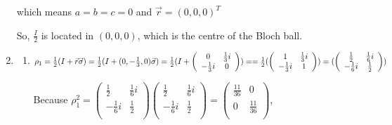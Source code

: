 \documentclass{article}
\begin{document}
\begin{enumerate}
          which means $a=b=c=0$ and $\vec{r}=(0,0,0)^T$

          So, $\frac{I}{2}$ is located in $(0,0,0)$, which is the centre of the Bloch ball.
    \item \begin{enumerate}
              \item $\rho_1
                        \\=\frac{1}{2}(I+\vec{r}\vec{\sigma})
                        \\=\frac{1}{2}(I+(0,-\frac{1}{3},0)\vec{\sigma})
                        \\=\frac{1}{2}(I+\left(
                        \begin{array}{cc}
                                0 & \frac{1}{3}i \\-\frac{1}{3}i&0\\
                            \end{array}
                        \right))
                        \\==\frac{1}{2}(\left(
                        \begin{array}{cc}
                                1 & \frac{1}{3}i \\-\frac{1}{3}i&1\\
                            \end{array}
                        \right))
                        \\=(\left(
                        \begin{array}{cc}
                                \frac{1}{2} & \frac{1}{6}i \\-\frac{1}{6}i&\frac{1}{2}\\
                            \end{array}
                        \right))
                    $

                    Because $\rho_1^2=\left(
                        \begin{array}{cc}
                                \frac{1}{2} & \frac{1}{6}i \\-\frac{1}{6}i&\frac{1}{2}\\
                            \end{array}
                        \right)\left(
                        \begin{array}{cc}
                                \frac{1}{2} & \frac{1}{6}i \\-\frac{1}{6}i&\frac{1}{2}\\
                            \end{array}
                        \right)=\left(
                        \begin{array}{cc}
                                \frac{11}{36} & 0 \\0&\frac{11}{36}\\
                            \end{array}
                        \right)
                    $,


\end{enumerate}
\end{enumerate}
\end{document}
